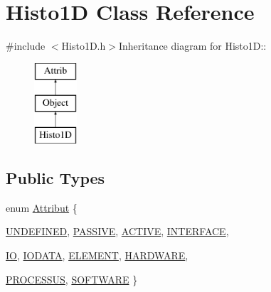 \hypertarget{classHisto1D}{
\section{Histo1D Class Reference}
\label{classHisto1D}
}


{\ttfamily \#include $<$Histo1D.h$>$}Inheritance diagram for Histo1D::\begin{figure}[H]
\begin{center}
\leavevmode
\includegraphics[height=3cm]{classHisto1D}
\end{center}
\end{figure}
\subsection*{Public Types}
\begin{DoxyCompactItemize}
\item 
enum \hyperlink{classAttrib_a69e171d7cc6417835a5a306d3c764235}{Attribut} \{ \par
\hyperlink{classAttrib_a69e171d7cc6417835a5a306d3c764235a3a8da2ab97dda18aebab196fe4100531}{UNDEFINED}, 
\hyperlink{classAttrib_a69e171d7cc6417835a5a306d3c764235a2bfb2af57b87031d190a05fe25dd92ed}{PASSIVE}, 
\hyperlink{classAttrib_a69e171d7cc6417835a5a306d3c764235a3b1fec929c0370d1436f2f06e298fb0d}{ACTIVE}, 
\hyperlink{classAttrib_a69e171d7cc6417835a5a306d3c764235aa27c16b480a369ea4d18b07b2516bbc7}{INTERFACE}, 
\par
\hyperlink{classAttrib_a69e171d7cc6417835a5a306d3c764235a1420a5b8c0540b2af210b6975eded7f9}{IO}, 
\hyperlink{classAttrib_a69e171d7cc6417835a5a306d3c764235a0af3b0d0ac323c1704e6c69cf90add28}{IODATA}, 
\hyperlink{classAttrib_a69e171d7cc6417835a5a306d3c764235a7788bc5dd333fd8ce18562b269c9dab1}{ELEMENT}, 
\hyperlink{classAttrib_a69e171d7cc6417835a5a306d3c764235a61ceb22149f365f1780d18f9d1459423}{HARDWARE}, 
\par
\hyperlink{classAttrib_a69e171d7cc6417835a5a306d3c764235a75250e29692496e73effca2c0330977f}{PROCESSUS}, 
\hyperlink{classAttrib_a69e171d7cc6417835a5a306d3c764235a103a67cd0b8f07ef478fa45d4356e27b}{SOFTWARE}
 \}
\end{DoxyCompactItemize}

